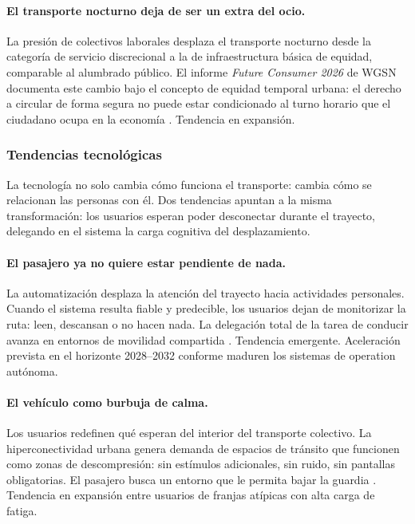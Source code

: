 \paragraph{El transporte nocturno deja de ser un extra del ocio.}
La presión de colectivos laborales desplaza el transporte
nocturno desde la categoría de servicio discrecional a la de
infraestructura básica de equidad, comparable al alumbrado
público. El informe \textit{Future Consumer 2026} de WGSN
documenta este cambio bajo el concepto de equidad temporal
urbana: el derecho a circular de forma segura no puede estar
condicionado al turno horario que el ciudadano ocupa en la
economía \parencite{WGSNFutureConsumer2026}. Tendencia en
expansión.

\subsubsection{Tendencias tecnológicas}
\label{sec:tendencias-tecnologicas}

La tecnología no solo cambia cómo funciona el transporte:
cambia cómo se relacionan las personas con él. Dos tendencias
apuntan a la misma transformación: los usuarios esperan poder
desconectar durante el trayecto, delegando en el sistema la
carga cognitiva del desplazamiento.

\paragraph{El pasajero ya no quiere estar pendiente de nada.}
La automatización desplaza la atención del trayecto hacia
actividades personales. Cuando el sistema resulta fiable y
predecible, los usuarios dejan de monitorizar la ruta: leen,
descansan o no hacen nada. La delegación total de la tarea de
conducir avanza en entornos de movilidad compartida
\parencite{TrendHunter2026}.
Tendencia emergente. Aceleración prevista en el horizonte
2028--2032 conforme maduren los sistemas de operation autónoma.

\paragraph{El vehículo como burbuja de calma.}
Los usuarios redefinen qué esperan del interior del transporte
colectivo. La hiperconectividad urbana genera demanda de
espacios de tránsito que funcionen como zonas de descompresión:
sin estímulos adicionales, sin ruido, sin pantallas obligatorias.
El pasajero busca un entorno que le permita bajar la guardia
\parencite{WGSNFutureConsumer2026}. Tendencia en expansión
entre usuarios de franjas atípicas con alta carga de fatiga.

